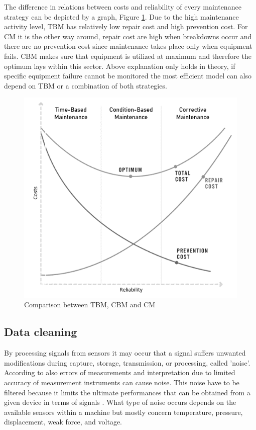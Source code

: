 The difference in relations between costs and reliability of every maintenance strategy can be depicted by a graph, Figure \ref{fig:optimummaintenance}. Due to the high maintenance activity level, TBM has relatively low repair cost and high prevention cost. For CM it is the other way around, repair cost are high when breakdowns occur and there are no prevention cost since maintenance takes place only when equipment fails. CBM makes sure that equipment is utilized at maximum and therefore the optimum lays within this sector. Above explanation only holds in theory, if specific equipment failure cannot be monitored the most efficient model can also depend on TBM or a combination of both strategies. 
\begin{figure}[ht]
\centering
\includegraphics[scale=0.8]{Figures/optimummaintenance}
\caption[Comparison between TBM, CBM and CM]{Comparison between TBM, CBM and CM\footnotemark}
\label{fig:optimummaintenance}
\end{figure}

\subsection{Data cleaning} \label{Data cleaning}
By processing signals from sensors it may occur that a signal suffers unwanted modifications during capture, storage, transmission, or processing, called 'noise'. According to \citet{Ghasemi2010} also errors of measurements and interpretation due to limited accuracy of measurement instruments can cause noise. This noise have to be filtered because it limits the ultimate performances that can be obtained from a given device in terms of signals \parencite{BORDONI1990}. What type of noise occurs depends on the available sensors within a machine but mostly concern temperature, pressure, displacement, weak force, and voltage.

